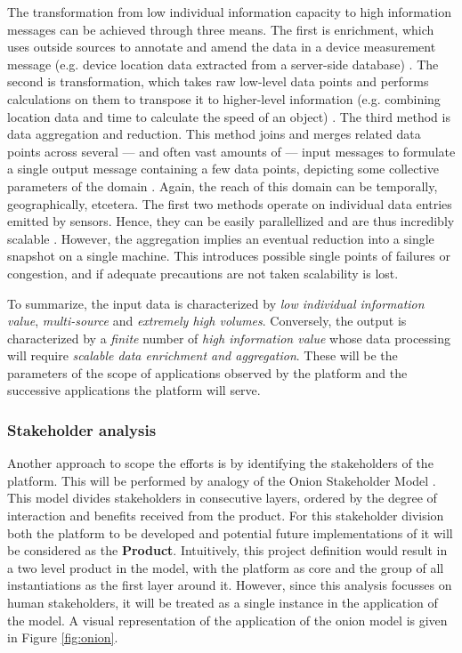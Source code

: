 The transformation from low individual information capacity to high information messages can be achieved through three means. The first is enrichment, which uses outside sources to annotate and amend the data in a device measurement message (e.g. device location data extracted from a server-side database) \cite{data_enrichment}. The second is transformation, which takes raw low-level data points and performs calculations on them to transpose it to higher-level information (e.g. combining location data and time to calculate the speed of an object) \cite{information_transformation}. The third method is data aggregation and reduction. This method joins and merges related data points across several --- and often vast amounts of --- input messages to formulate a single output message containing a few data points, depicting some collective parameters of the domain \cite{information_transformation}. Again, the reach of this domain can be temporally, geographically, etcetera. The first two methods operate on individual data entries emitted by sensors. Hence, they can be easily parallellized and are thus incredibly scalable \cite{data_mining_and_cleaning}. However, the aggregation implies an eventual reduction into a single snapshot on a single machine. This introduces possible single points of failures or congestion, and if adequate precautions are not taken scalability is lost.

To summarize, the input data is characterized by \emph{low individual information value}, \emph{multi-source} and \emph{extremely high volumes}. Conversely, the output is characterized by a \emph{finite} number of \emph{high information value} whose data processing will require \emph{scalable data enrichment and aggregation}. These will be the parameters of the scope of applications observed by the platform and the successive applications the platform will serve.

\subsubsection*{Stakeholder analysis}
Another approach to scope the efforts is by identifying the stakeholders of the platform. This will be performed by analogy of the Onion Stakeholder Model \cite{onion}. This model divides stakeholders in consecutive layers, ordered by the degree of interaction and benefits received from the product. For this stakeholder division both the platform to be developed and potential future implementations of it will be considered as the \textbf{Product}. Intuitively, this project definition would result in a two level product in the model, with the platform as core and the group of all instantiations as the first layer around it. However, since this analysis focusses on human stakeholders, it will be treated as a single instance in the application of the model. A visual representation of the application of the onion model is given in Figure \ref{fig:onion}.

